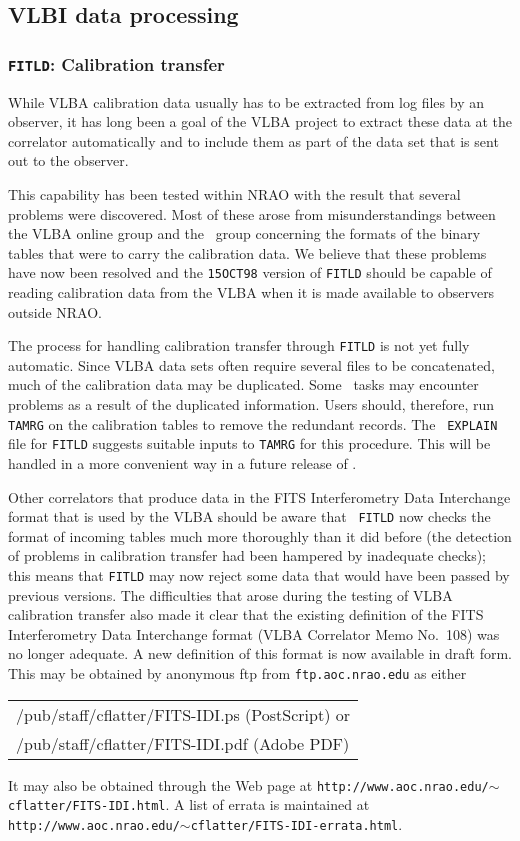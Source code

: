 \subsection{VLBI data processing}

\subsubsection{{\tt FITLD}: Calibration transfer}

While VLBA calibration data usually has to be extracted from log files
by an observer, it has long been a goal of the VLBA project to
extract these data at the correlator automatically and to include them
as part of the data set that is sent out to the observer.

This capability has been tested within NRAO with the result that
several problems were discovered.  Most of these arose from
misunderstandings between the VLBA online group and the \AIPS\ group
concerning the formats of the binary tables that were to carry the
calibration data. We believe that these problems have now been
resolved and the {\tt 15OCT98} version of {\tt FITLD} should be
capable of reading calibration data from the VLBA when it is made
available to observers outside \hbox{NRAO}.

The process for handling calibration transfer through {\tt FITLD} is
not yet fully automatic.  Since VLBA data sets often require several
files to be concatenated, much of the calibration data may be
duplicated.  Some \AIPS\ tasks may encounter problems as a result of
the duplicated information.  Users should, therefore, run {\tt TAMRG}
on the calibration tables to remove the redundant records.  The {\tt
EXPLAIN} file for {\tt FITLD} suggests suitable inputs to {\tt TAMRG}
for this procedure.  This will be handled in a more convenient way in
a future release of \hbox{\AIPS}.

Other correlators that produce data in the FITS Interferometry Data
Interchange format that is used by the VLBA should be aware that {\tt
FITLD} now checks the format of incoming tables much more thoroughly
than it did before (the detection of problems in calibration transfer
had been hampered by inadequate checks); this means that {\tt FITLD}
may now reject some data that would have been passed by previous
versions.  The difficulties that arose during the testing of VLBA
calibration transfer also made it clear that the existing definition
of the FITS Interferometry Data Interchange format (VLBA Correlator
Memo No.~108) was no longer adequate. A new definition of this format
is now available in draft form. This may be obtained by anonymous ftp
from {\tt ftp.aoc.nrao.edu} as either
\begin{center}
\begin{tabular}{l}
/pub/staff/cflatter/FITS-IDI.ps (PostScript) or \\
/pub/staff/cflatter/FITS-IDI.pdf (Adobe PDF)
\end{tabular}
\end{center}
It may also be obtained through the Web page at
{\tt http://www.aoc.nrao.edu/$\sim$cflatter/FITS-IDI.html}. A list of
errata is maintained at {\tt
http://www.aoc.nrao.edu/$\sim$cflatter/FITS-IDI-errata.html}.

